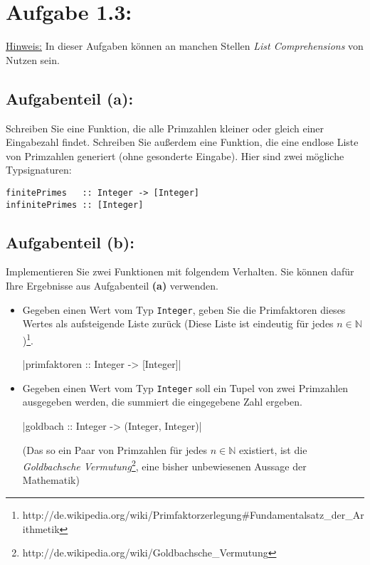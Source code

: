 \documentclass[a4paper,10pt]{scrartcl}
\newcommand{\theuebungszettel}{1}
\begin{document}
\section*{Aufgabe \theuebungszettel.3:}

\underline{Hinweis:} In dieser Aufgaben können an manchen Stellen \emph{List Comprehensions} von Nutzen sein.

\subsection*{Aufgabenteil (a):}

Schreiben Sie eine Funktion, die alle Primzahlen kleiner oder gleich einer Eingabezahl findet. Schreiben Sie außerdem eine Funktion, die eine endlose Liste von Primzahlen generiert (ohne gesonderte Eingabe).
Hier sind zwei mögliche Typsignaturen:

\begin{verbatim}
finitePrimes   :: Integer -> [Integer]
infinitePrimes :: [Integer]
\end{verbatim}

\subsection*{Aufgabenteil (b):}

Implementieren Sie zwei Funktionen mit folgendem Verhalten. Sie können dafür Ihre Ergebnisse aus Aufgabenteil \textbf{(a)} verwenden.

\begin{itemize}
\item Gegeben einen Wert vom Typ \texttt{Integer}, geben Sie die Primfaktoren dieses Wertes
      als aufsteigende Liste zurück (Diese Liste ist eindeutig für jedes $n \in \mathbb{N}$)\footnote{http://de.wikipedia.org/wiki/Primfaktorzerlegung\#Fundamentalsatz\_der\_Arithmetik}.

      |primfaktoren :: Integer -> [Integer]|

\item Gegeben einen Wert vom Typ \texttt{Integer} soll ein Tupel von zwei Primzahlen ausgegeben
      werden, die summiert die eingegebene Zahl ergeben.

      |goldbach :: Integer -> (Integer, Integer)|
      
      (Das so ein Paar von Primzahlen für jedes $n \in \mathbb{N}$ existiert, ist die 
      \emph{Goldbachsche Vermutung}\footnote{http://de.wikipedia.org/wiki/Goldbachsche\_Vermutung}, 
      eine bisher unbewiesenen Aussage der Mathematik)
\end{itemize}
\end{document}
